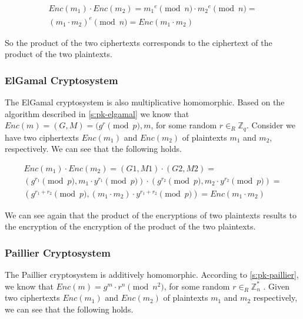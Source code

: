 \begin{equation}
  \label{eq:homomorphic-rsa}
  \begin{gathered}
Enc(m_1) \cdot Enc(m_2) = {m_1}^{e}\pmod{n} \cdot {m_2}^{e}\pmod{n} =\\ ({m_1}\cdot{m_2})^{e}\pmod{n} = Enc({m_1}\cdot{m_2})
  \end{gathered}
\end{equation}


So the product of the two ciphertexts corresponds to the ciphertext of the product of the two plaintexts.

\subsubsection{ElGamal Cryptosystem}\label{ss:elgamal}
The ElGamal cryptosystem is also multiplicative homomorphic. Based on the algorithm described in \ref{s:pk-elgamal} we know that $Enc(m) = (G,M) = (g^{r} \pmod{p}, m$, for some random $r \in_{R} \mathbb{Z}_{q}$. Consider we have two ciphertexts $Enc(m_1)$ and $Enc(m_2)$ of plaintexts $m_1$ and $m_2$, respectively. We can see that the following holds.

\begin{equation}
  \label{eq:homomorphic-elgamal}
  \begin{gathered}
Enc(m_1) \cdot Enc(m_2) = (G1, M1) \cdot (G2, M2) =\\ (g^{r_1} \pmod{p}, m_1 \cdot y^{r_1} \pmod{p}) \cdot (g^{r_2} \pmod{p}, m_2 \cdot y^{r_2} \pmod{p}) =\\ (g^{r_1+r_2} \pmod{p}, (m_1 \cdot m_2) \cdot y^{r_1+r_2} \pmod{p}) = Enc({m_1} \cdot {m_2})
  \end{gathered}
\end{equation}

We can see again that the product of the encryptions of two plaintexts results to the encryption of the encryption of the product of the two plaintexts.

\subsubsection{Paillier Cryptosystem}\label{ss:paillier}
The Paillier cryptosystem is additively homomorphic. According to \ref{s:pk-paillier}, we know that $Enc(m) = g^{m} \cdot r^n \pmod{n^2}$, for some random $ r \in_{R} \mathbb{Z}_{n}^{*}$ . Given two ciphertexts $Enc(m_1)$ and $Enc(m_2)$ of plaintexts $m_1$ and $m_2$ respectively, we can see that the following holds.

